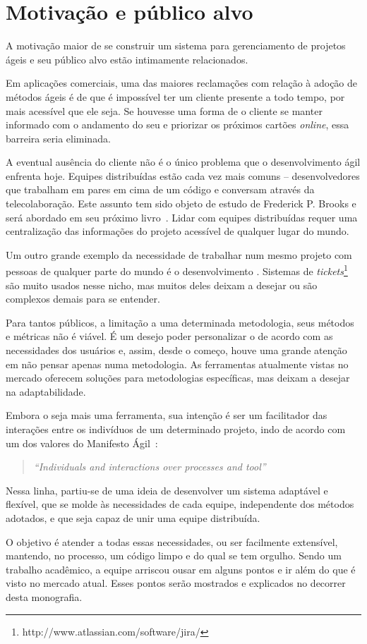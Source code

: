 \section{Motivação e público alvo}

A motivação maior de se construir um sistema para gerenciamento de projetos ágeis e seu público alvo estão intimamente relacionados. 

Em aplicações comerciais, uma das maiores reclamações com relação à adoção de métodos ágeis é de que é impossível ter um cliente presente a todo tempo, por mais acessível que ele seja. Se houvesse uma forma de o cliente se manter informado com o andamento do seu \software{} e priorizar os próximos cartões \textit{online}, essa barreira seria eliminada.

A eventual ausência do cliente não é o único problema que o desenvolvimento ágil enfrenta hoje. Equipes distribuídas estão cada vez mais comuns -- desenvolvedores que trabalham em pares em cima de um código e conversam através da telecolaboração. Este assunto tem sido objeto de estudo de Frederick P. Brooks e será abordado em seu próximo livro~\cite{brooks}. Lidar com equipes distribuídas requer uma centralização das informações do projeto acessível de qualquer lugar do mundo.

Um outro grande exemplo da necessidade de trabalhar num mesmo projeto com pessoas de qualquer parte do mundo é o desenvolvimento \opensource{}. Sistemas de \textit{tickets}\footnote{http://www.atlassian.com/software/jira/} são muito usados nesse nicho, mas muitos deles deixam a desejar ou são complexos demais para se entender.

Para tantos públicos, a limitação a uma determinada metodologia, seus métodos e métricas não é viável. É um desejo poder personalizar o \calopsita{} de acordo com as necessidades dos usuários e, assim, desde o começo, houve uma grande atenção em não pensar apenas numa metodologia. As ferramentas atualmente vistas no mercado oferecem soluções para metodologias específicas, mas deixam a desejar na adaptabilidade.

Embora o \calopsita{} seja mais uma ferramenta, sua intenção é ser um facilitador das interações entre os indivíduos de um determinado projeto, indo de acordo com um dos valores do Manifesto Ágil~\cite{manifesto}:

\begin{quote}
\textit{``Individuals and interactions over processes and tool''}
\end{quote}

Nessa linha, partiu-se de uma ideia de desenvolver um sistema adaptável e flexível, que se molde às necessidades de cada equipe, independente dos métodos adotados, e que seja capaz de unir uma equipe distribuída.

O objetivo é atender a todas essas necessidades, ou ser facilmente extensível, mantendo, no processo, um código limpo e do qual se tem orgulho. Sendo um trabalho acadêmico, a equipe arriscou ousar em alguns pontos e ir além do que é visto no mercado atual. Esses pontos serão mostrados e explicados no decorrer desta monografia.
